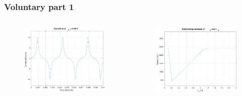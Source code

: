 \documentclass[aspectratio=1610]{beamer}
\begin{document}
\begin{frame}
\frametitle{Voluntary part 1}
	\begin{columns}
			\begin{figure}
				\includegraphics[scale=0.25]{figs/voluntary_1_Umax.png}
			\end{figure}
			\begin{figure}
				\includegraphics[scale=0.25]{figs/voluntary_1_r.png}
			\end{figure}
	\end{columns}
\end{frame}
\end{document}
